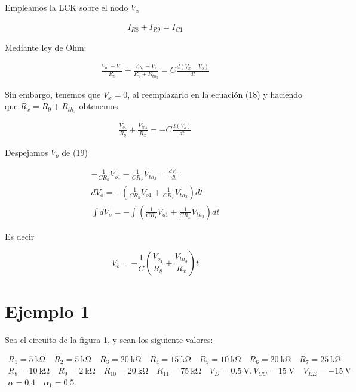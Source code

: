 \documentclass{article}
\begin{document}
Empleamos la LCK sobre el nodo $V_x$

\begin{align}
	I_{R8} + I_{R9} = I_{C1}
\end{align}

Mediante ley de Ohm:

\begin{align}
	\frac{V_{o_1} - V_x}{R_8} + \frac{V_{th_3} - V_x}{R_9 + R_{th_3}} = C\frac{d(V_x - V_o)}{dt}
\end{align}


Sin embargo, tenemos que $V_x = 0$, al reemplazarlo en la ecuación (18) y haciendo que $R_x = R_9 + R_{th_3}$ obtenemos

\begin{align}
	\frac{V_{o_1}}{R_8} + \frac{V_{th_3}}{R_x} = -C\frac{d(V_o)}{dt}
\end{align}

Despejamos $V_o$ de (19)

\begin{align}
	-\frac{1}{CR_8}V_{o1} - \frac{1}{CR_x}V_{th_3} = \frac{dV_o}{dt} \nonumber \\
	dV_o = - \left( \frac{1}{CR_8}V_{o1} + \frac{1}{CR_x}V_{th_3} \right)dt \nonumber \\
	\int dV_o = - \int \left( \frac{1}{CR_8}V_{o1} + \frac{1}{CR_x}V_{th_3} \right)dt
\end{align}

Es decir

\begin{tcolorbox}[colback=red!5!white,colframe=red!75!black,arc=0mm,boxrule=0mm,width=(\linewidth+0.5cm)]
	\begin{equation}
		V_o = - \frac{1}{C} \left( \frac{V_{o_1}}{R_8} + \frac{V_{th_3}}{R_x} \right) t
	\end{equation}
\end{tcolorbox}

\section{Ejemplo 1}
Sea el circuito de la figura 1, y sean los siguiente valores:

\begin{align}
	R_1 = \qty{5}{\kilo \ohm} \quad R_2 = \qty{5}{\kilo \ohm} \quad R_3 = \qty{20}{\kilo \ohm} \quad R_4 = \qty{15}{\kilo \ohm} \quad R_5 = \qty{10}{\kilo \ohm} \quad R_6 = \qty{20}{\kilo \ohm} \quad R_7 = \qty{25}{\kilo \ohm} \nonumber \\
	R_8 = \qty{10}{\kilo \ohm} \quad R_9 = \qty{2}{\kilo \ohm} \quad R_{10} = \qty{20}{\kilo \ohm} \quad R_{11} = \qty{75}{\kilo \ohm} \quad V_D = \qty{0.5}{\volt}, V_{CC} = \qty{15}{\volt} \quad V_{EE} = \qty{-15}{\volt} \nonumber \\
	\alpha = 0.4 \quad \alpha_1 = 0.5 \nonumber  \qquad \qquad \qquad \qquad \qquad \qquad \qquad \qquad
\end{align}
\end{document}
